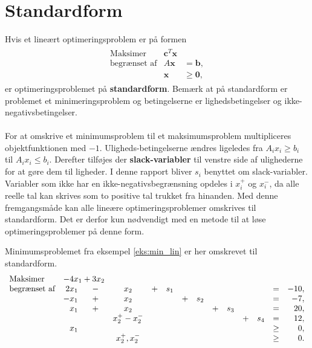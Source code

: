 \section{Standardform}
% 
Hvis et lineært optimeringsproblem er på formen
%
\begin{align*}
\begin{array}{lrl}
\text{Maksimer}		&\textbf{c}^T\textbf{x}	&				\\
\text{begrænset af}	&A\textbf{x}	&=\mathbf{b},	\\
					&\mathbf{x}				&\geq \mathbf{0},
\end{array}
\end{align*}
%
er optimeringsproblemet på \textbf{standardform}.
Bemærk at på standardform er problemet et minimeringsproblem og betingelserne er lighedsbetingelser og ikke-negativsbetingelser.\\\\
%
For at omskrive et minimumsproblem til et maksimumsproblem multipliceres objektfunktionen med $-1$.
Uligheds-betingelserne ændres ligeledes fra $A_ix_i \geq b_i$ til $A_ix_i \leq b_i$.
Derefter tilføjes der \textbf{slack-variabler} til venstre side af ulighederne for at gøre dem til ligheder.
I denne rapport bliver $s_i$ benyttet om slack-variabler.
Variabler som ikke har en ikke-negativsbegrænsning opdeles i $x_i^+$ og $x_i^-$, da alle reelle tal kan skrives som to positive tal trukket fra hinanden.
Med denne fremgangsmåde kan alle lineære optimeringsproblemer omskrives til standardform.
Det er derfor kun nødvendigt med en metode til at løse optimeringsproblemer på denne form.
%

%
\begin{eks}
Minimumsproblemet fra eksempel \ref{eks:min_lin} er her omskrevet til standardform.
%
\begin{align*}
\begin{array}{lrcccrcrcrcrcrcr}
\text{Maksimer}		&	\multicolumn{2}{c}{-4x_1 + 3x_2}\\
\text{begrænset af}	&2x_1	&-	&x_2		&+	&s_1&	&	&	&	&	&	&= 		&-10,\\
					&-x_1	&+	&x_2		&	&	&+	&s_2&	&	&	&	&=		& -7,\\
					&x_1	&+	&x_2		&	&	&	&	&+	&s_3&	&	&=		& 20,\\
					& 		&	&x_2^+-x_2^-	&	&	&	&	&	&	&+	&s_4&=		& 12,\\
					&x_1	&	&			&	&	&	&	&	&	&	&	&\geq	& 0,\\
					&		&	&x_2^+,x_2^-&	&	&	&	&	&	&	&	&\geq	& 0.\\
\end{array}
\end{align*}
\end{eks}